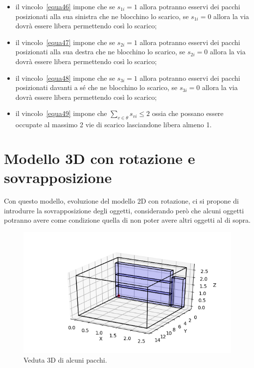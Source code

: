 \begin{itemize}
	\item il vincolo~\eqref{equa46} impone che se $s_{1i} = 1$ allora potranno esservi dei pacchi posizionati alla sua sinistra che ne blocchino lo scarico, se $s_{1i} = 0$ allora la via dovrà essere libera permettendo così lo scarico;
	\item il vincolo~\eqref{equa47} impone che se $s_{2i} = 1$ allora potranno esservi dei pacchi posizionati alla sua destra che ne blocchino lo scarico, se $s_{2i} = 0$ allora la via dovrà essere libera permettendo così lo scarico;
	\item il vincolo~\eqref{equa48} impone che se $s_{3i} = 1$ allora potranno esservi dei pacchi posizionati davanti a sé che ne blocchino lo scarico, se $s_{3i} = 0$ allora la via dovrà essere libera permettendo così lo scarico;
	\item il vincolo~\eqref{equa49} impone che $\sum_{v \in \theta} s_{vi} \leq 2$ ossia che possano essere occupate al massimo 2 vie di scarico lasciandone libera almeno 1.
\end{itemize}

\newpage
\section{Modello 3D con rotazione e sovrapposizione}
Con questo modello, evoluzione del modello 2D con rotazione, ci si propone di introdurre la sovrapposizione degli oggetti, considerando però che alcuni oggetti potranno avere come condizione quella di non poter avere altri oggetti al di sopra.

\begin{figure}[H]
	\begin{center} \includegraphics[scale=0.7]{figures/3d}
		\caption[Grafico con merci 3D]{Veduta 3D di alcuni pacchi.}
		\label{fig:3d_grafics}
	\end{center}
\end{figure}

